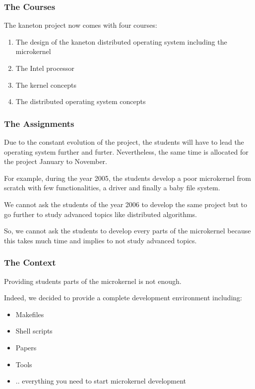 \documentclass[8pt]{beamer}
\newcommand{\nl}[0]{\vspace{0.4cm}}
\begin{document}

\begin{frame}
  \frametitle{The Courses}

  The kaneton project now comes with four courses:

  \begin{enumerate}
    \item
      The design of the kaneton distributed operating system including
      the microkernel
    \item
      The Intel processor
    \item
      The kernel concepts
    \item
      The distributed operating system concepts
  \end{enumerate}
\end{frame}


\begin{frame}
  \frametitle{The Assignments}

  Due to the constant evolution of the project, the students will have
  to lead the operating system further and furter. Nevertheless, the same
  time is allocated for the project January to November.

  \nl

  For example, during the year 2005, the students develop a poor microkernel
  from scratch with few functionalities, a driver and finally a baby
  file system.

  \nl

  We cannot ask the students of the year 2006 to develop the same project
  but to go further to study advanced topics like distributed algorithms.

  \nl

  So, we cannot ask the students to develop every parts of the microkernel
  because this takes much time and implies to not study advanced
  topics.
\end{frame}


\begin{frame}
  \frametitle{The Context}

  Providing students parts of the microkernel is not enough.

  \nl

  Indeed, we decided to provide a complete development environment
  including:

  \begin{itemize}
    \item
      Makefiles
    \item
      Shell scripts
    \item
      Papers
    \item
      Tools
    \item
      .. everything you need to start microkernel development
  \end{itemize}
\end{frame}
\end{document}
